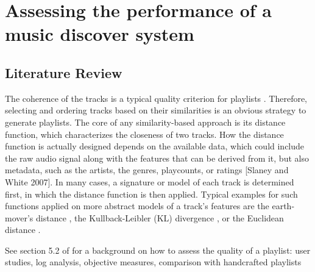 \chapter{Assessing the performance of a music discover system} 

\label{Chapter3} 


\section{Literature Review}

The coherence of the tracks is a typical quality criterion for playlists \cite{logan04}. 
Therefore, selecting and ordering tracks based on their similarities is an obvious strategy to generate playlists. The core of any similarity-based approach is its distance function, which characterizes the closeness of two tracks. How the distance function is actually designed depends on the available data, which could include the raw audio signal along with the features that can be derived from it, but also metadata, such as the artists, the genres, playcounts, or ratings [Slaney and White 2007]. In many cases, a signature or model of each track is determined first, in which the distance function is then applied. Typical examples for such functions applied on more abstract models of a track’s features are the earth-mover’s distance \cite{logan04}, the Kullback-Leibler (KL) divergence \cite{vignoli05}, or the Euclidean distance \cite{knees06}.

See section 5.2 of \cite{bonnin14} for a background on how to assess the quality of a playlist: user studies, log analysis, objective measures, comparison with handcrafted playlists

